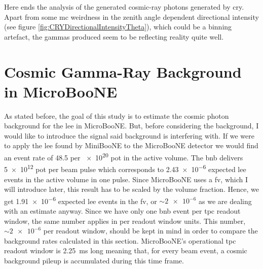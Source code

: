 Here ends the analysis of the generated cosmic-ray photons generated by \gls{cry}. Apart from some \gls{mc} weirdness in the zenith angle dependent directional intensity (see figure \ref{fig:CRYDirectionalIntensityTheta}), which could be a binning artefact, the gammas produced seem to be reflecting reality quite well. 

\section{Cosmic Gamma-Ray Background in MicroBooNE}
As stated before, the goal of this study is to estimate the cosmic photon background for the \gls{lee} in MicroBooNE. But, before considering the background, I would like to introduce the signal said background is interfering with. If we were to apply the \gls{lee} found by MiniBooNE to the MicroBooNE detector we would find an event rate of \num{48.5} per \num{e20} \gls{pot} in the active volume. The \gls{bnb} delivers \num{5e12} \gls{pot} per beam pulse \cite{BNBBeamFlux} which corresponds to \num{2.43e-6} expected \gls{lee} events in the active volume in one pulse. Since MicroBooNE uses a \gls{fv}, which I will introduce later, this result has to be scaled by the volume fraction. Hence, we get \num{1.91e-6} expected \gls{lee} events in the \gls{fv}, or $\sim\num{2e-6}$ as we are dealing with an estimate anyway. Since we have only one \gls{bnb} event per \gls{tpc} readout window, the same number applies in per readout window units. This number, $\sim\num{2e-6}$ per readout window, should be kept in mind in order to compare the background rates calculated in this section. MicroBooNE's operational \gls{tpc} readout window is \SI{2.25}{\milli\second} long meaning that, for every beam event, a cosmic background pileup is accumulated during this time frame.

